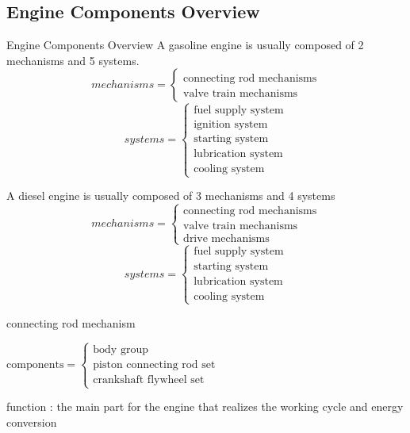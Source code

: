 \subsection{Engine Components Overview}
\begin{frame}{Engine Components Overview}
	A gasoline engine is usually composed of 2 mechanisms and 5 systems.
	\begin{equation*}
		mechanisms =
			\begin{cases}
				\text{connecting rod mechanisms} \\
				\text{valve train mechanisms}
			\end{cases}
	\end{equation*}
	\begin{equation*}
		systems =
			\begin{cases}
				\text{fuel supply system} \\
				\text{ignition system} \\
				\text{starting system} \\
				\text{lubrication system} \\
				\text{cooling system}
			\end{cases}
	\end{equation*}
\end{frame}
\begin{frame}
	A diesel engine is usually composed of 3 mechanisms and 4 systems
	\begin{equation*}
		mechanisms =
		\begin{cases}
			\text{connecting rod mechanisms} \\
			\text{valve train mechanisms}\\
			\text{drive mechanisms}
		\end{cases}
	\end{equation*}
	\begin{equation*}
		systems =
		\begin{cases}
			\text{fuel supply system} \\
			\text{starting system} \\
			\text{lubrication system} \\
			\text{cooling system}
		\end{cases}
	\end{equation*}
\end{frame}
\begin{frame}
	\begin{block}{connecting rod mechanism}
		\begin{compactitem}
			\item 
			$
				\text{components} = \begin{cases}
					\text{body group} \\
					\text{piston connecting rod set} \\
					\text{crankshaft flywheel set}
				\end{cases}
			$
			\item function : the main part for the engine that realizes the working cycle and energy conversion
		\end{compactitem}
	\end{block}
\end{frame}
